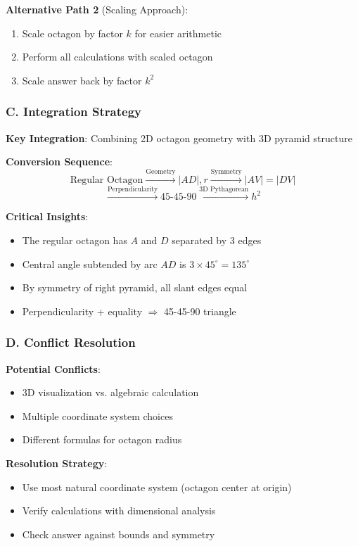 \documentclass[12pt]{article}
\begin{document}
\begin{techniquesbox}
\textbf{Alternative Path 2} (Scaling Approach):
\begin{enumerate}
    \item Scale octagon by factor $k$ for easier arithmetic
    \item Perform all calculations with scaled octagon
    \item Scale answer back by factor $k^2$
\end{enumerate}

\subsubsection*{C. Integration Strategy}

\textbf{Key Integration}: Combining 2D octagon geometry with 3D pyramid structure

\textbf{Conversion Sequence}:
$$\text{Regular Octagon} \xrightarrow{\text{Geometry}} |AD|, r \xrightarrow{\text{Symmetry}} |AV| = |DV|$$
$$\xrightarrow{\text{Perpendicularity}} 45\text{-}45\text{-}90 \xrightarrow{\text{3D Pythagorean}} h^2$$

\textbf{Critical Insights}:
\begin{itemize}
    \item The regular octagon has $A$ and $D$ separated by 3 edges
    \item Central angle subtended by arc $AD$ is $3 \times 45^\circ = 135^\circ$
    \item By symmetry of right pyramid, all slant edges equal
    \item Perpendicularity + equality $\Rightarrow$ 45-45-90 triangle
\end{itemize}

\subsubsection*{D. Conflict Resolution}

\textbf{Potential Conflicts}:
\begin{itemize}
    \item 3D visualization vs. algebraic calculation
    \item Multiple coordinate system choices
    \item Different formulas for octagon radius
\end{itemize}

\textbf{Resolution Strategy}:
\begin{itemize}
    \item Use most natural coordinate system (octagon center at origin)
    \item Verify calculations with dimensional analysis
    \item Check answer against bounds and symmetry
\end{itemize}

\end{techniquesbox}
\end{document}
